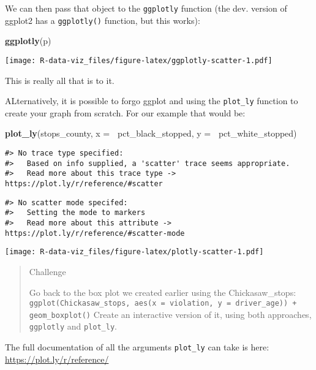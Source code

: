\documentclass[]{book}
\newenvironment{Shaded}{\begin{snugshade}}{\end{snugshade}}
\newcommand{\DataTypeTok}[1]{\textcolor[rgb]{0.13,0.29,0.53}{#1}}
\newcommand{\KeywordTok}[1]{\textcolor[rgb]{0.13,0.29,0.53}{\textbf{#1}}}
\newcommand{\NormalTok}[1]{#1}
\newcommand{\OperatorTok}[1]{\textcolor[rgb]{0.81,0.36,0.00}{\textbf{#1}}}
\begin{document}
We can then pass that object to the \texttt{ggplotly} function (the dev. version of ggplot2 has a \texttt{ggplotly()} function, but this works):

\begin{Shaded}
\begin{Highlighting}[]
\KeywordTok{ggplotly}\NormalTok{(p) }
\end{Highlighting}
\end{Shaded}

\texttt{[image: R-data-viz\_files/figure-latex/ggplotly-scatter-1.pdf]}

This is really all that is to it.

ALternatively, it is possible to forgo ggplot and using the \texttt{plot\_ly} function to create your graph from scratch. For our example that would be:

\begin{Shaded}
\begin{Highlighting}[]
\KeywordTok{plot_ly}\NormalTok{(stops_county, }\DataTypeTok{x =} \OperatorTok{~}\NormalTok{pct_black_stopped, }\DataTypeTok{y =} \OperatorTok{~}\NormalTok{pct_white_stopped)}
\end{Highlighting}
\end{Shaded}

\begin{verbatim}
#> No trace type specified:
#>   Based on info supplied, a 'scatter' trace seems appropriate.
#>   Read more about this trace type -> https://plot.ly/r/reference/#scatter
\end{verbatim}

\begin{verbatim}
#> No scatter mode specifed:
#>   Setting the mode to markers
#>   Read more about this attribute -> https://plot.ly/r/reference/#scatter-mode
\end{verbatim}

\texttt{[image: R-data-viz\_files/figure-latex/plotly-scatter-1.pdf]}

\begin{quote}
Challenge

Go back to the box plot we created earlier using the Chickasaw\_stops:
\texttt{ggplot(Chickasaw\_stops,\ aes(x\ =\ violation,\ y\ =\ driver\_age))\ +}
\texttt{geom\_boxplot()}
Create an interactive version of it, using both approaches,
\texttt{ggplotly} and \texttt{plot\_ly}.
\end{quote}

The full documentation of all the arguments \texttt{plot\_ly} can take is here: \url{https://plot.ly/r/reference/}
\end{document}
